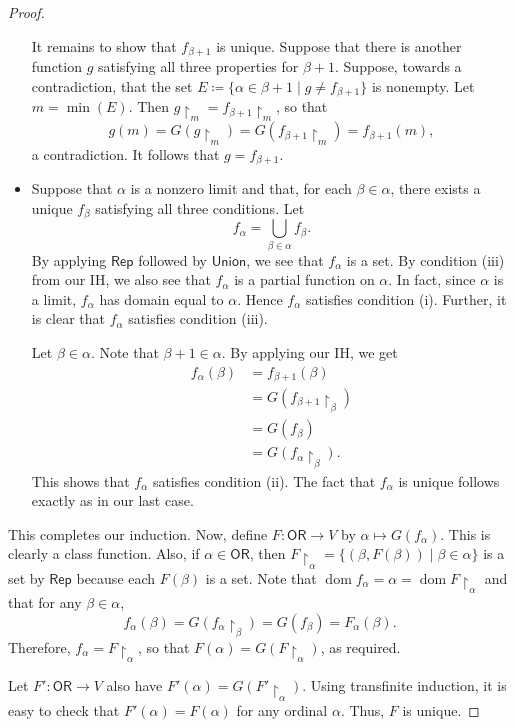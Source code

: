 \documentclass[10pt,letterpaper,cm]{nupset}
\theoremstyle{definition}
\theoremstyle{theorem}
\theoremstyle{remark}
\newcommand{\1}{\mathbf{1}}
\newcommand{\0}{\vec 0}
\newcommand{\ord}{\mathsf{OR}}
\DeclareMathOperator{\dom}{dom}
\begin{document}
\begin{proof}
\begin{itemize}
 It remains to show that $f_{\beta +1}$ is unique. Suppose that there is another function $g$ satisfying all three properties for $\beta +1$. Suppose, towards a contradiction, that the set $E\coloneqq \{\alpha  \in \beta +1 \mid g \ne f_{\beta +1}\}$ is nonempty. Let $m = \min(E)$. Then $g\restriction_m = f_{\beta +1}\restriction_m $, so that $$g(m) = G(g\restriction_m)  = G(f_{\beta +1}\restriction_m) = f_{\beta +1}(m),$$ a contradiction. It follows that $g = f_{\beta +1}$.
\item Suppose that $\alpha$ is a nonzero limit and that, for each $\beta \in \alpha$, there exists a unique $f_{\beta}$ satisfying all three conditions. Let $$f_{\alpha} =\bigcup_{\beta \in \alpha} f_{\beta}.$$ By applying $\mathsf{Rep}$ followed by $\mathsf{Union}$, we see that $f_{\alpha}$ is a set. By condition (iii) from our IH, we also see that $f_{\alpha}$ is a partial function on $\alpha$. In fact, since $\alpha$ is a limit, $f_{\alpha}$ has domain equal to $\alpha$. Hence $f_{\alpha}$ satisfies condition (i). Further, it is clear that $f_{\alpha}$ satisfies condition (iii). 

Let $\beta \in \alpha$. Note that $\beta +1 \in \alpha$. By applying our IH, we get
\begin{align*}
f_{\alpha}(\beta) & = f_{\beta +1}(\beta)  
\\ &  = G(f_{\beta +1}\restriction_{\beta}) 
\\ & = G(f_{\beta})  
\\ & = G(f_{\alpha}\restriction_{\beta}).
\end{align*}
This shows that $f_{\alpha}$ satisfies condition (ii). The fact that $f_{\alpha}$ is unique follows exactly as in our last case.
\end{itemize}$ $This completes our induction. Now, define $F: \ord \to V$ by $\alpha \mapsto G(f_{\alpha})$. This is clearly a class function. Also, if $\alpha \in \ord$, then $F\restriction_{\alpha} = \{(\beta, F(\beta)) \mid \beta \in \alpha\}$ is a set by $\mathsf{Rep}$ because  each $F(\beta)$ is a set. Note that $\dom{f_{\alpha}} = \alpha = \dom{F\restriction_{\alpha}}$ and that for any $\beta \in \alpha$,
$$  f_{\alpha}(\beta) = G(f_{\alpha}\restriction_{\beta}) =  G(f_{\beta})= F_{\alpha}(\beta)  .$$ Therefore, $f_{\alpha} = F\restriction_{\alpha}$, so that $F(\alpha) = G(F\restriction_{\alpha})$, as required. 

\smallskip

Let $F' : \ord \to V$ also have $F'(\alpha) = G(F'\restriction_{\alpha})$. Using transfinite induction, it is easy to check that $F'(\alpha) = F(\alpha)$ for any ordinal $\alpha$. Thus, $F$ is unique. 
\end{proof}
\end{document}
